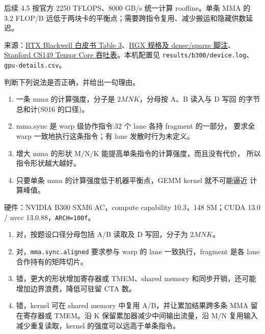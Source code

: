 \documentclass[11pt,a4paper,fontset=fandol]{ctexart}
\begin{document}
\begin{answer}
后续 4.5 按官方 2250 TFLOPS、8000 GB/s 统一计算 roofline。单条 MMA 的
3.2 FLOP/B
远低于两块卡的平衡点；需要跨指令复用、减少搬运和隐藏供数延迟。

来源：\href{https://images.nvidia.com/aem-dam/Solutions/geforce/blackwell/nvidia-rtx-blackwell-gpu-architecture.pdf}{RTX
Blackwell 白皮书 Table
3}、\href{https://www.nvidia.com/en-us/data-center/hgx/}{HGX 规格及
dense/sparse
脚注}、\href{https://gfxcourses.stanford.edu/cs149/fall25content/media/proghardware/11_SpecializedHardwareProgramming.pdf}{Stanford
CS149 Tensor Core 吞吐表}。本机配置见
\texttt{results/\allowbreak{}b300/\allowbreak{}device.\allowbreak{}log}、\texttt{gpu-\allowbreak{}details.\allowbreak{}csv}。

\end{answer}


判断下列说法是否正确，并给出一句理由。

\begin{enumerate}
\def\labelenumi{(\alph{enumi})}
\item
  一条 mma 的计算强度，分子是 \(2MNK\)，分母按 A、B 读入与 D 写回
  的字节总和计(S016 的口径)。
\item
  mma.sync 是 warp 级协作指令:32 个 lane 各持 fragment 的一部分， 要求全
  warp 一致地执行这条指令；有 lane 发散时行为未定义。
\item
  增大 mma 的形状 M/N/K 能提高单条指令的计算强度，而且没有代价，
  所以指令形状越大越好。
\item
  只要单条 mma 的计算强度低于机器平衡点，GEMM kernel 就不可能逼近
  计算峰值。
\end{enumerate}

\begin{answer}

硬件：NVIDIA B300 SXM6 AC，compute capability 10.3，148 SM；CUDA 13.0 /
nvcc 13.0.88，\texttt{ARCH=\allowbreak{}100f}。

\begin{enumerate}
\def\labelenumi{(\alph{enumi})}
\item
  对，按题设口径分母包括 A/B 读取及 D 写回，分子为 \(2MNK\)。
\item
  对，\texttt{mma.\allowbreak{}sync.\allowbreak{}aligned} 要求参与 warp
  的 lane 一致执行，fragment 是各 lane 合作持有的矩阵切片。
\item
  错，更大的形状增加寄存器或 TMEM、shared memory
  和同步开销，还可能增加边界浪费，降低可驻留 CTA 数。
\item
  错，kernel 可在 shared memory 中复用 A/B，并让累加结果跨多条 MMA
  留在寄存器或 TMEM。沿 K 保留累加器减少中间输出流量，沿 M/N
  复用输入减少重复读取，kernel 的强度可以远高于单条指令。
\end{enumerate}

\end{answer}
\end{document}
